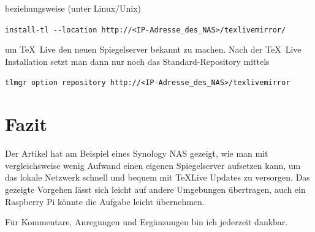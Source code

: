 \documentclass{dtk}
\begin{document}
beziehungsweise (unter Linux/Unix) 

{\footnotesize \verb|install-tl --location http://<IP-Adresse_des_NAS>/texlivemirror/|}

um \TeX~Live den neuen Spiegelserver bekannt zu machen. Nach der \TeX~Live Installation setzt man dann nur noch das Standard-Repository mittels 

\verb|tlmgr option repository http://<IP-Adresse_des_NAS>/texlivemirror|

\section{Fazit}

Der Artikel hat am Beispiel eines Synology NAS gezeigt, wie man mit vergleichsweise wenig Aufwand einen eigenen Spiegelserver aufsetzen kann, um das lokale Netzwerk schnell und bequem mit \TeX Live Updates zu versorgen. Das gezeigte Vorgehen lässt sich leicht auf andere Umgebungen übertragen, auch ein Raspberry Pi könnte die Aufgabe leicht übernehmen.

Für Kommentare, Anregungen und Ergänzungen bin ich jederzeit dankbar.
\end{document}
